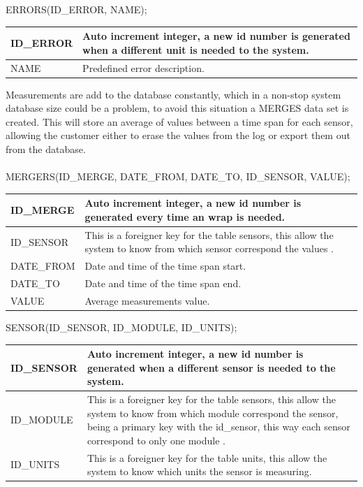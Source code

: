 ERRORS(ID\_ERROR, NAME);

\begin{table}[H]
\centering
	\begin{tabular}{| p{2cm} | p{10cm} |}
		\hline
		ID\_ERROR & Auto increment integer, a new id number is generated when a different unit is needed to the system. \\\hline
		NAME & Predefined error description. \\\hline
	\end{tabular}
\end{table}

Measurements are add to the database constantly, which in a non-stop system database size could be a problem, to avoid this situation a MERGES data set is created. This will store an average of values between a time span for each sensor, allowing the customer either to erase the values from the log or export them out from the database.
\\\\

MERGERS(ID\_MERGE, DATE\_FROM, DATE\_TO, ID\_SENSOR, VALUE);

\begin{table}[H]
\centering
	\begin{tabular}{| l | p{10cm} |}
		\hline
		ID\_MERGE & Auto increment integer, a new id number is generated every time an wrap is needed. \\\hline
		ID\_SENSOR & This is a foreigner key for the table sensors, this allow the system to know from which sensor correspond the values .\\\hline
		DATE\_FROM & Date and time of the time span start. \\\hline
		DATE\_TO & Date and time of the time span end. \\\hline
		VALUE & Average measurements value. \\\hline
	\end{tabular}
\end{table}

SENSOR(ID\_SENSOR, ID\_MODULE, ID\_UNITS);

\begin{table}[H]
\centering
	\begin{tabular}{| p{2cm} | p{10cm} |}
		\hline
		ID\_SENSOR & Auto increment integer, a new id number is generated when a different sensor is needed to the system. \\\hline
		ID\_MODULE & This is a foreigner key for the table sensors, this allow the system to know from which module correspond the sensor, being a primary key with the id\_sensor, this way each sensor correspond to only one module .\\\hline
		ID\_UNITS & This is a foreigner key for the table units, this allow the system to know which units the sensor is measuring.\\\hline
	\end{tabular}
\end{table}

